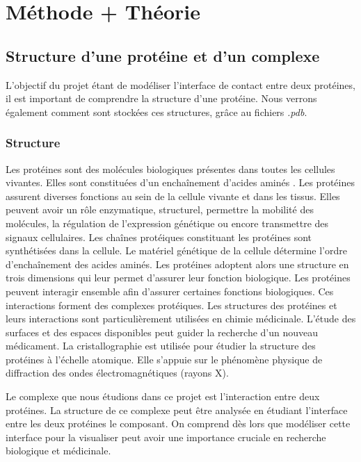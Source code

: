\chapter{Méthode + Théorie}

\section{Structure d'une protéine et d'un complexe}

L'objectif du projet étant de modéliser l'interface de contact entre deux protéines,
il est important de comprendre la structure d'une protéine. Nous verrons également
comment sont stockées ces structures, grâce au fichiers \textit{.pdb}.

\subsection*{Structure}

Les protéines sont des molécules biologiques présentes dans toutes les cellules vivantes.
Elles sont constituées d'un enchaînement d'acides aminés \cite{Prot}.
Les protéines assurent diverses fonctions au sein de la cellule vivante et dans les tissus.
Elles peuvent avoir un rôle enzymatique, structurel, permettre la mobilité des molécules, la
régulation de l'expression génétique ou encore transmettre des signaux cellulaires.
Les chaînes protéiques constituant les protéines sont synthétisées dans la cellule. Le
matériel génétique de la cellule détermine l'ordre d'enchaînement des acides aminés.
Les protéines adoptent alors une structure en trois dimensions qui leur permet d'assurer
 leur fonction biologique. Les protéines peuvent interagir ensemble afin d'assurer certaines
fonctions biologiques. Ces interactions forment des complexes protéiques. Les structures
 des protéines et leurs interactions sont particulièrement utilisées en chimie médicinale.
L'étude des surfaces et des espaces disponibles peut guider la recherche d'un nouveau
médicament. La cristallographie est utilisée pour étudier la structure des protéines à
l'échelle atomique. Elle s'appuie sur le phénomène physique de diffraction des ondes
électromagnétiques (rayons X).

Le complexe que nous étudions dans ce projet est l'interaction entre
deux protéines. La structure de ce complexe peut être analysée en étudiant l'interface
entre les deux protéines le composant. On comprend dès lors que modéliser cette interface
pour la visualiser peut avoir une importance cruciale en recherche biologique et médicinale.

